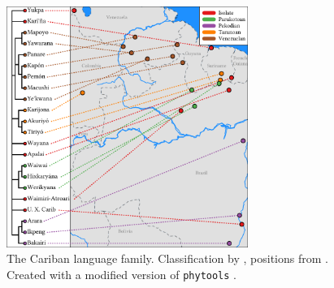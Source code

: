 \begin{figure}[htbp]
	\centering
\includegraphics[width=0.7\textwidth]{floats/genealogical_map}
	\caption[The Cariban language family]{The Cariban language family. Classification by \textcite{matter2021cariban}, positions from \textcite{glottolog}. Created with a modified version of \texttt{phytools} \parencite{phytools2012}.}
	\label{fig:phylomap}
\end{figure}